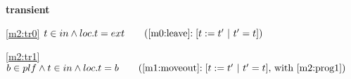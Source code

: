 \textbf{transient}
\begin{block}
\item[ \eqref{m2:tr0} ]{$t \in in \land loc.t = ext  \qquad \text{(\ref{m0:leave}$: [t := t'~|~t' = t]$)}$} %
\item[ \eqref{m2:tr1} ]{$b \in plf \land t \in in \land loc.t = b  \qquad \text{(\ref{m1:moveout}$: [t := t'~|~t' = t]$, with \eqref{m2:prog1})}$} %
\end{block}
